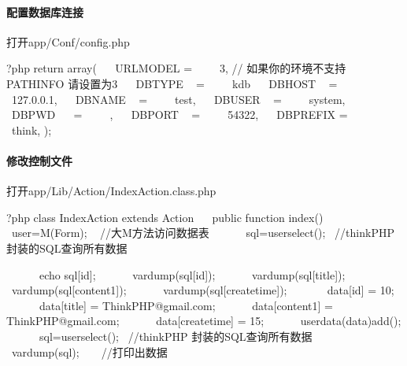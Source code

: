 \documentclass[letterpaper,10pt,english]{sphinxmanual}
\begin{document}
\paragraph{配置数据库连接}
\label{\detokenize{interface/thinkPHP:id4}}
打开app/Conf/config.php

\begin{sphinxVerbatim}[commandchars=\\\{\}]
\PYGZlt{}?php
return array(
    \PYGZsq{}URL\PYGZus{}MODEL\PYGZsq{} =\PYGZgt{}      3, // 如果你的环境不支持PATHINFO 请设置为3
    \PYGZsq{}DB\PYGZus{}TYPE\PYGZsq{}   =\PYGZgt{}      \PYGZsq{}kdb\PYGZsq{}
    \PYGZsq{}DB\PYGZus{}HOST\PYGZsq{}   =\PYGZgt{}      \PYGZsq{}127.0.0.1\PYGZsq{},
    \PYGZsq{}DB\PYGZus{}NAME\PYGZsq{}   =\PYGZgt{}      \PYGZsq{}test\PYGZsq{},
    \PYGZsq{}DB\PYGZus{}USER\PYGZsq{}   =\PYGZgt{}      \PYGZsq{}system\PYGZsq{},
    \PYGZsq{}DB\PYGZus{}PWD\PYGZsq{}    =\PYGZgt{}      \PYGZsq{}\PYGZsq{},
    \PYGZsq{}DB\PYGZus{}PORT\PYGZsq{}   =\PYGZgt{}      \PYGZsq{}54322\PYGZsq{},
    \PYGZsq{}DB\PYGZus{}PREFIX\PYGZsq{} =\PYGZgt{}      \PYGZsq{}think\PYGZus{}\PYGZsq{},
);
\end{sphinxVerbatim}


\paragraph{修改控制文件}
\label{\detokenize{interface/thinkPHP:id5}}
打开app/Lib/Action/IndexAction.class.php

\begin{sphinxVerbatim}[commandchars=\\\{\}]
\PYGZlt{}?php
class IndexAction extends Action \PYGZob{}
    public function index()\PYGZob{}
        \PYGZdl{}user=M(\PYGZsq{}Form\PYGZsq{});   //大M方法访问数据表
        \PYGZdl{}sql=\PYGZdl{}user\PYGZhy{}\PYGZgt{}select();  //thinkPHP 封装的SQL查询所有数据

        echo \PYGZdl{}sql[\PYGZsq{}id\PYGZsq{}];
        var\PYGZus{}dump(\PYGZdl{}sql[\PYGZsq{}id\PYGZsq{}]);
        var\PYGZus{}dump(\PYGZdl{}sql[\PYGZsq{}title\PYGZsq{}]);
        var\PYGZus{}dump(\PYGZdl{}sql[\PYGZsq{}content1\PYGZsq{}]);
        var\PYGZus{}dump(\PYGZdl{}sql[\PYGZsq{}create\PYGZus{}time\PYGZsq{}]);
​
        \PYGZdl{}data[\PYGZsq{}id\PYGZsq{}] = 10;
        \PYGZdl{}data[\PYGZsq{}title\PYGZsq{}] = \PYGZsq{}ThinkPHP@gmail.com\PYGZsq{};
        \PYGZdl{}data[\PYGZsq{}content1\PYGZsq{}] = \PYGZsq{}ThinkPHP@gmail.com\PYGZsq{};
        \PYGZdl{}data[\PYGZsq{}create\PYGZus{}time\PYGZsq{}] = 15;
        \PYGZdl{}user\PYGZhy{}\PYGZgt{}data(\PYGZdl{}data)\PYGZhy{}\PYGZgt{}add();
        \PYGZdl{}sql=\PYGZdl{}user\PYGZhy{}\PYGZgt{}select();  //thinkPHP 封装的SQL查询所有数据
        var\PYGZus{}dump(\PYGZdl{}sql);     //打印出数据
    \PYGZcb{}
\PYGZcb{}
\end{sphinxVerbatim}
\end{document}
